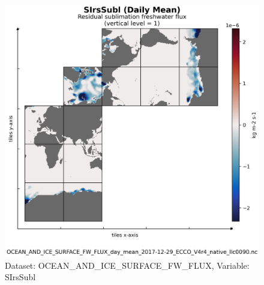 \begin{figure}[H]
\centering
\includegraphics[scale=0.55]{../images/plots/v4r4/native_plots/Ocean_and_Sea-Ice_Surface_Freshwater_Fluxes/SIrsSubl.png}
\caption{Dataset: OCEAN\_AND\_ICE\_SURFACE\_FW\_FLUX, Variable: SIrsSubl}
\label{tab:table-OCEAN_AND_ICE_SURFACE_FW_FLUX_SIrsSubl-Plot}
\end{figure}
\newpage
\pagebreak
